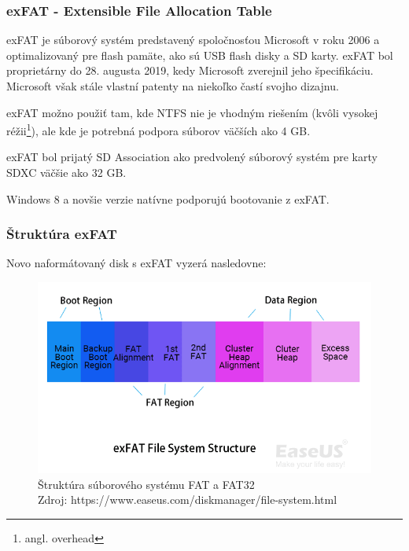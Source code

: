 \documentclass[12pt,oneside,slovak,a4paper]{article}
\begin{document}
\subsubsection{exFAT - Extensible File Allocation Table}
exFAT je súborový systém predstavený spoločnosťou Microsoft v roku 2006 a optimalizovaný pre flash pamäte, ako sú USB flash disky a SD karty. exFAT bol proprietárny do 28. augusta 2019, kedy Microsoft zverejnil jeho špecifikáciu. Microsoft však stále vlastní patenty na niekoľko častí svojho dizajnu.

exFAT možno použiť tam, kde NTFS nie je vhodným riešením (kvôli vysokej réžii\footnote{angl. overhead}), ale kde je potrebná podpora súborov väčších ako 4 GB.

exFAT bol prijatý SD Association ako predvolený súborový systém pre karty SDXC väčšie ako 32 GB.

Windows 8 a novšie verzie natívne podporujú bootovanie z exFAT.

\subsubsection{Štruktúra exFAT}
Novo naformátovaný disk s exFAT vyzerá nasledovne:

\begin{figure}[H]
	\centering
	\captionsetup{justification=centering,margin=2cm}
	\includegraphics[width=\linewidth]{./images/exfat-file-system-structure.png}
	\centering
	\caption{Štruktúra súborového systému FAT a FAT32 \\ Zdroj: https://www.easeus.com/diskmanager/file-system.html}
\end{figure}
\end{document}
